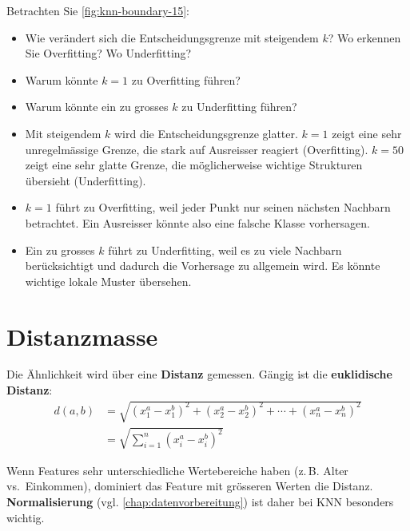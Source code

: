 \begin{myexercise}
    Betrachten Sie \cref{fig:knn-boundary-15}:
    \begin{itemize}
        \item Wie verändert sich die Entscheidungsgrenze mit steigendem $k$? Wo erkennen Sie Overfitting? Wo Underfitting?
        \item Warum könnte $k=1$ zu Overfitting führen?
        \item Warum könnte ein zu grosses $k$ zu Underfitting führen?
    \end{itemize}
    \begin{myanswer}
        \begin{itemize}
            \item Mit steigendem $k$ wird die Entscheidungsgrenze glatter. $k=1$ zeigt eine sehr unregelmässige Grenze, die stark auf Ausreisser reagiert (Overfitting). $k=50$ zeigt eine sehr glatte Grenze, die möglicherweise wichtige Strukturen übersieht (Underfitting).
            \item $k=1$ führt zu Overfitting, weil jeder Punkt nur seinen nächsten Nachbarn betrachtet. Ein Ausreisser könnte also eine falsche Klasse vorhersagen.
            \item Ein zu grosses $k$ führt zu Underfitting, weil es zu viele Nachbarn berücksichtigt und dadurch die Vorhersage zu allgemein wird. Es könnte wichtige lokale Muster übersehen.
        \end{itemize}
    \end{myanswer}
\end{myexercise}

\section{Distanzmasse}

Die Ähnlichkeit wird über eine \textbf{Distanz} gemessen. Gängig ist die \textbf{euklidische Distanz}:
\[
    \begin{aligned}
        d(a, b) &= \sqrt{(x_1^a - x_1^b)^2 + (x_2^a - x_2^b)^2 + \cdots + (x_n^a - x_n^b)^2 } \\
                & = \sqrt{\sum_{i=1}^n (x_i^a - x_i^b)^2}
    \end{aligned}
\]

\begin{mycaution}
    Wenn Features sehr unterschiedliche Wertebereiche haben (z.\,B. Alter vs.\ Einkommen),
    dominiert das Feature mit grösseren Werten die Distanz.
    \textbf{Normalisierung} (vgl.  \cref{chap:datenvorbereitung}) ist daher bei KNN besonders wichtig.
\end{mycaution}

